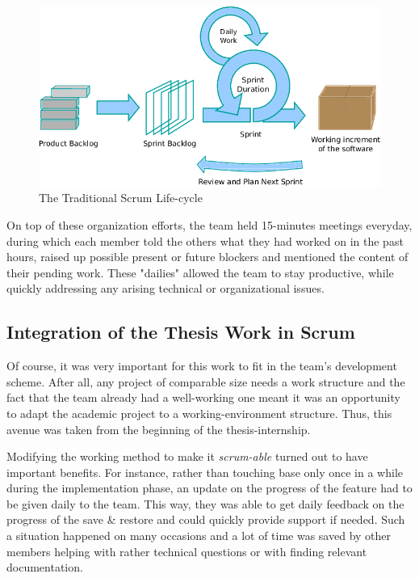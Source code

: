 {\begin{figure}[H]
	\centering
	\includegraphics[width=0.9\linewidth,keepaspectratio]{art/scrum-process.png}
	\caption{The Traditional Scrum Life-cycle\cite{misc:scrum-process}}
	\label{fig:scrum-process}
\end{figure}

On top of these organization efforts, the team held 15-minutes meetings everyday, during which each member told the others what they had worked on in the past hours, raised up possible present or future blockers and mentioned the content of their pending work. These "dailies" allowed the team to stay productive, while quickly addressing any arising technical or organizational issues.

\subsection*{Integration of the Thesis Work in Scrum}
Of course, it was very important for this work to fit in the team's development scheme. After all, any project of comparable size needs a work structure and the fact that the team already had a well-working one meant it was an opportunity to adapt the academic project to a working-environment structure. Thus, this avenue was taken from the beginning of the thesis-internship.

Modifying the working method to make it \textit{scrum-able} turned out to have important benefits. For instance, rather than touching base only once in a while during the implementation phase, an update on the progress of the feature had to be given daily to the team. This way, they was able to get daily feedback on the progress of the save \& restore and could quickly provide support if needed. Such a situation happened on many occasions and a lot of time was saved by other members helping with rather technical questions or with finding relevant documentation. 

}
